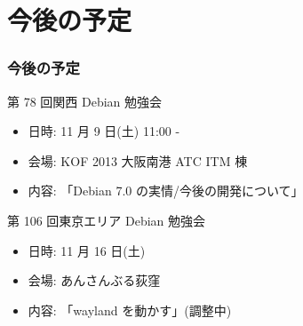 \documentclass[cjk,dvipdfmx,10pt,compress,%
hyperref={bookmarks=true,bookmarksnumbered=true,bookmarksopen=false,%
colorlinks=false,%
pdftitle={第 77 回 関西 Debian 勉強会},%
pdfauthor={倉敷・のがた・佐々木・かわだ・八津尾},%
pdfsubject={資料},%
}]{beamer}
\begin{document}
\section{今後の予定}
\begin{frame}[fragile]
\frametitle{今後の予定}

\begin{block}{第 78 回関西 Debian 勉強会}
  \begin{itemize}
  \item 日時: 11 月 9 日(土) 11:00 -
  \item 会場: KOF 2013 大阪南港 ATC ITM 棟
  \item 内容: 「Debian 7.0 の実情/今後の開発について」
  \end{itemize}
\end{block}

\begin{block}{第 106 回東京エリア Debian 勉強会}
  \begin{itemize}
  \item 日時: 11 月 16 日(土)
  \item 会場: あんさんぶる荻窪
  \item 内容: 「wayland を動かす」(調整中)
  \end{itemize}
\end{block}

\end{frame}

\takahashi[50]{  }
\end{document}
